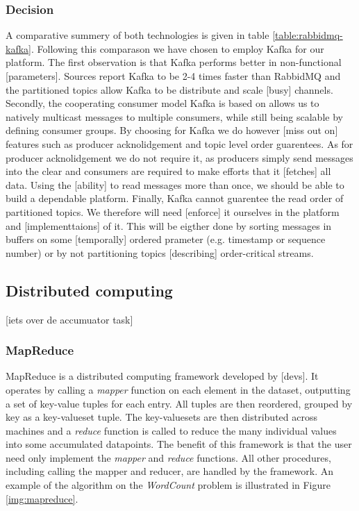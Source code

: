 \subsubsection{Decision}
A comparative summery of both technologies is given in table \ref{table:rabbidmq-kafka}. Following this comparason we have chosen to employ Kafka for our platform. The first observation is that Kafka performs better in non-functional [parameters]. Sources report Kafka to be 2-4 times faster than RabbidMQ\cite{speed_kafka} and the partitioned topics allow Kafka to be distribute and scale [busy] channels. Secondly, the cooperating consumer model Kafka is based on allows us to natively multicast messages to multiple consumers, while still being scalable by defining consumer groups. By choosing for Kafka we do however [miss out on] features such as producer acknolidgement and topic level order guarentees. As for producer acknolidgement we do not require it, as producers simply send messages into the clear and consumers are required to make efforts that it [fetches] all data. Using the [ability] to read messages more than once, we should be able to build a dependable platform. Finally, Kafka cannot guarentee the read order of partitioned topics. We therefore will need [enforce] it ourselves in the platform and [implementtaions] of it. This will be eigther done by sorting messages in buffers on some [temporally] ordered prameter (e.g. timestamp or sequence number) or by not partitioning topics [describing] order-critical streams.

\subsection{Distributed computing}
[iets over de accumuator task]
\subsubsection{MapReduce}
MapReduce\cite{web:mapreduce} is a distributed computing framework developed by [devs]. It operates by calling a \emph{mapper} function on each element in the dataset, outputting a set of key-value tuples for each entry. All tuples are then reordered, grouped by key as a key-valueset tuple. The key-valuesets are then distributed across machines and a \emph{reduce} function is called to reduce the many individual values into some accumulated datapoints. The benefit of this framework is that the user need only implement the \emph{mapper} and \emph{reduce} functions. All other procedures, including calling the mapper and reducer, are handled by the framework. An example of the algorithm on the \emph{WordCount} problem is illustrated in Figure \ref{img:mapreduce}.

